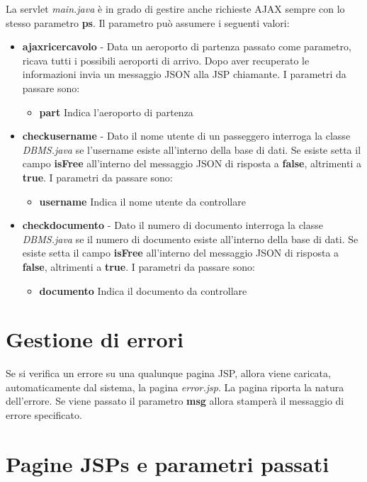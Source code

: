 \documentclass[a4paper,10pt]{article}
\begin{document}
 La servlet \textit{main.java} \`e in grado di gestire anche richieste AJAX sempre con lo stesso parametro \textbf{ps}. Il parametro pu\`o assumere i seguenti valori:
 \begin{itemize}
 \item \textbf{ajaxricercavolo} - Data un aeroporto di partenza passato come parametro, ricava tutti i possibili aeroporti di arrivo. Dopo aver recuperato le informazioni invia un messaggio JSON alla JSP
				  chiamante.
				  I parametri da passare sono:
				  \begin{itemize}
				   \item \textbf{part} Indica l'aeroporto di partenza
				  \end{itemize}

 \item \textbf{checkusername} - Dato il nome utente di un passeggero interroga la classe \textit{DBMS.java} se l'username esiste all'interno della base di dati. Se esiste setta il campo \textbf{isFree} all'interno 
				del messaggio JSON di risposta a \textbf{false}, altrimenti a \textbf{true}.
				  I parametri da passare sono:
				  \begin{itemize}
				   \item \textbf{username} Indica il nome utente da controllare
				  \end{itemize}
 \item \textbf{checkdocumento} - Dato il numero di documento interroga la classe \textit{DBMS.java} se il numero di documento esiste all'interno della base di dati.
				Se esiste setta il campo \textbf{isFree} all'interno 
				del messaggio JSON di risposta a \textbf{false}, altrimenti a \textbf{true}.
 				  I parametri da passare sono:
				  \begin{itemize}
				   \item \textbf{documento} Indica il documento da controllare
				  \end{itemize}
\end{itemize}

\section{Gestione di errori}
Se si verifica un errore su una qualunque pagina JSP, allora viene caricata, automaticamente dal 
sistema, la pagina \textit{error.jsp}. La pagina riporta la natura dell'errore. Se viene passato il parametro \textbf{msg} allora 
stamper\`a il messaggio di errore specificato.

\section{Pagine JSPs e parametri passati}
\end{document}
